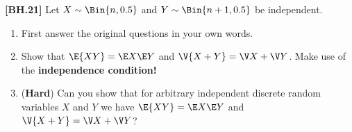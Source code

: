 \begin{exercise}
	\textbf{[BH.21]} Let $X \sim \Bin{n, 0.5}$ and $Y \sim \Bin{n + 1, 0.5}$ be independent.
	\begin{enumerate} 
		\item First answer the original questions in your own words.
		\item Show that $\E{XY}= \E X\E Y$ and $\V{X+Y}=\V X+\V Y$. Make use of the \textbf{independence condition!}  
		\item (\textbf{Hard}) Can you show that for arbitrary independent discrete random variables $X$ and $Y$ we have  $\E{XY}=\E X\E Y$ and $\V{X+Y}=\V X+\V Y$?
	\end{enumerate}
\end{exercise}
